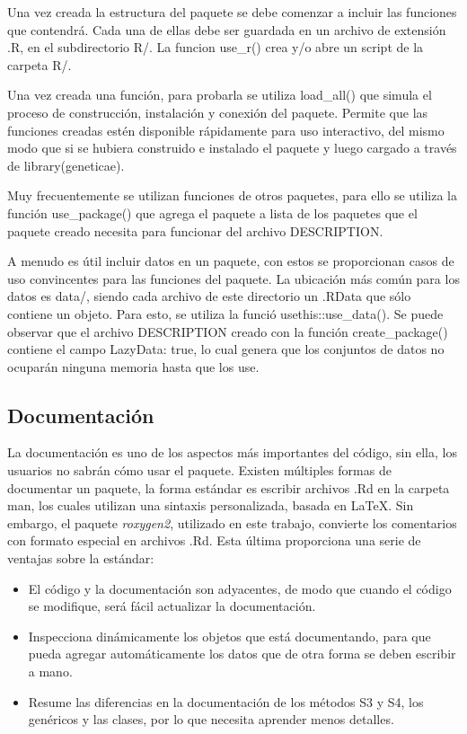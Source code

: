 Una vez creada la estructura del paquete se debe comenzar a incluir las funciones que contendrá. Cada una de ellas debe ser guardada en un archivo de extensión .R, en el subdirectorio R/. La funcion use\_r() crea y/o abre un script de la carpeta R/.

Una vez creada una función, para probarla se utiliza load\_all() que simula el proceso de construcción, instalación y conexión del paquete. Permite que las funciones creadas estén disponible rápidamente para uso interactivo, del mismo modo que si se hubiera construido e instalado el paquete y luego cargado a través de library(geneticae).

Muy frecuentemente se utilizan funciones de otros paquetes, para ello se utiliza la función use\_package() que agrega el paquete  a lista de los paquetes que el paquete creado necesita para funcionar del archivo DESCRIPTION.

A menudo es útil incluir datos en un paquete, con estos se proporcionan casos de uso convincentes para las funciones del paquete. La ubicación más común para los datos es data/, siendo cada archivo de este directorio un .RData que sólo contiene un  objeto. Para esto, se utiliza la funció usethis::use\_data(). Se puede observar que el archivo DESCRIPTION creado con la función create\_package() contiene el campo LazyData: true, lo cual genera que los conjuntos de datos no ocuparán ninguna memoria hasta que los use.

\subsection{Documentación}

La documentación es uno de los aspectos más importantes del código, sin ella, los usuarios no sabrán cómo usar el paquete. Existen múltiples formas de documentar un paquete, la forma estándar es escribir archivos .Rd en la carpeta man, los cuales utilizan una sintaxis personalizada, basada en LaTeX. Sin embargo, el paquete \emph{roxygen2}, utilizado en este trabajo, convierte los comentarios con formato especial en archivos .Rd. Esta última proporciona una serie de ventajas sobre la estándar:

\begin{itemize}
\item El código y la documentación son adyacentes, de modo que cuando el código se modifique, será fácil actualizar la documentación.

\item Inspecciona dinámicamente los objetos que está documentando, para que pueda agregar automáticamente los datos que de otra forma se deben escribir a mano.

\item Resume las diferencias en la documentación de los métodos S3 y S4, los genéricos y las clases, por lo que necesita aprender menos detalles.
\end{itemize}

